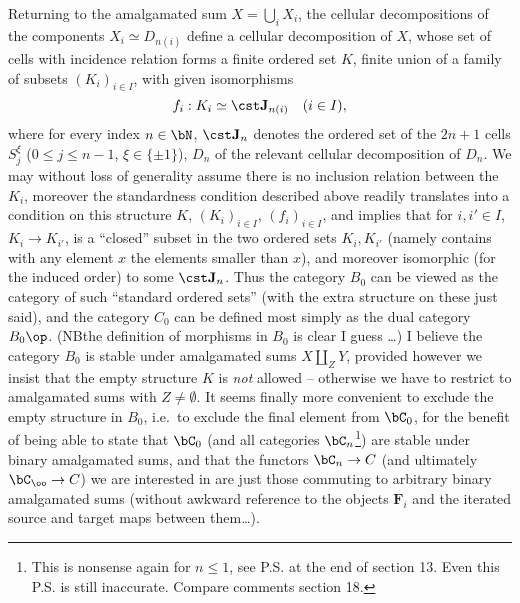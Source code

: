 \newpage 

\presectionfill{}\par

%
\label{sec:8}%
Returning to the amalgamated sum $X = \bigcup_i X_i$, the cellular
decompositions of the components $X_i \simeq  D_{n(i)}$ define a
cellular decomposition of $X$, whose set of cells with incidence
relation forms a finite ordered set $K$, finite union of a family of
subsets $(K_i)_{i\in I}$, with given isomorphisms
\[ f_i : K_i \simeq  \cst \mathbf{J}_{n(i)} \quad (i\in I),\]
where for every index $n\in\bN$, $\cst \mathbf{J}_n$ denotes the ordered set of
the $2n+1$ cells $S_j^\xi$ ($0\le j\le n-1$, $\xi\in\{\pm1\}$), $D_n$
of the relevant cellular decomposition of $D_n$. We may without loss
of generality assume there is no inclusion relation between the $K_i$,
moreover the standardness condition described above readily translates
into a condition on this structure $K$, $(K_i)_{i\in I}$, $(f_i)_{i\in
  I}$, and implies that for $i,i'\in I$, $K_i\to K_{i'}$, is a
``closed'' subset in the two ordered sets $K_i,K_{i'}$ (namely
contains with any element $x$ the elements smaller than $x$), and
moreover isomorphic (for the induced order) to some $\cst \mathbf{J}_n$. Thus
the category $B_0$ can be viewed as the category of such ``standard
ordered sets'' (with the extra structure on these just said), and the
category $C_0$ can be defined most simply as the dual category
$B_0\op$. (NB\enspace the definition of morphisms in $B_0$ is clear I guess
\ldots) I believe the category $B_0$ is stable under amalgamated sums
$X \amalg_Z Y$, provided however we insist that the empty structure
$K$ is \emph{not} allowed -- otherwise we have to restrict to
amalgamated sums with $Z \ne \emptyset$. It seems finally more
convenient to exclude the empty structure in $B_0$, i.e.\ to exclude
the final element from $\bC_0$, for the benefit of being able to
state that $\bC_0$ (and all categories $\bC_n$\footnote{This is nonsense again for $n \leq 1$, see P.S. at the end of section 13. Even this P.S. is still inaccurate. Compare comments section 18.}) are stable under binary amalgamated sums,
and that the functors $\bC_n\to C$ (and ultimately $\bC_\oo\to
C$) we are interested in are just those commuting to arbitrary binary
amalgamated sums (without awkward reference to the objects $\boldsymbol F_i$
and the iterated source and target maps between them\ldots).

